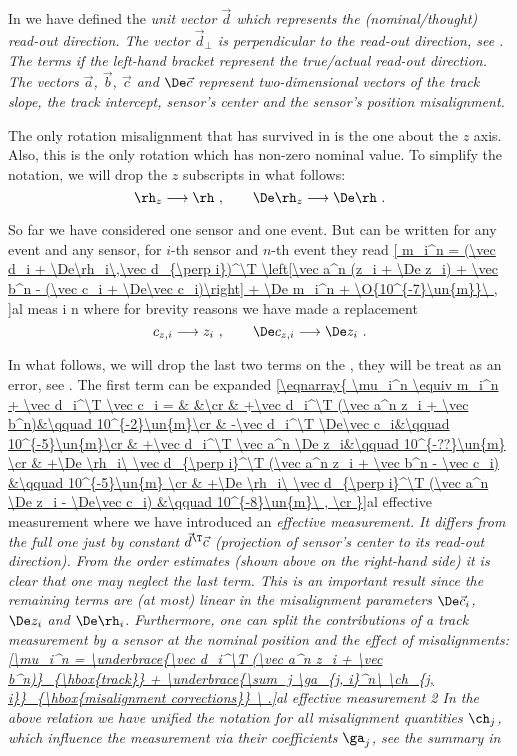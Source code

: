 In  we have defined the \em{unit} vector $\vec d$ which represents the (nominal/thought) \em{read-out direction}. The vector $\vec d_\perp$ is perpendicular to the read-out direction, see . The terms if the left-hand bracket represent the true/actual read-out direction. The vectors $\vec a$, $\vec b$, $\vec c$ and $\De \vec c$ represent two-dimensional vectors of the track slope, the track intercept, sensor's center and the sensor's position misalignment.

The only rotation misalignment that has survived in  is the one about the $z$ axis. Also, this is the only rotation which has non-zero nominal value. To simplify the notation, we will drop the $z$ subscripts in what follows:
$$\rh_z \longrightarrow \rh\ ,\qquad \De\rh_z \longrightarrow \De\rh\ .$$

So far we have considered one sensor and one event. But  can be written for any event and any sensor, for $i$-th sensor and $n$-th event they read
\eqref{
m_i^n = (\vec d_i + \De\rh_i\,\vec d_{\perp i})^\T \left[\vec a^n (z_i + \De z_i) + \vec b^n - (\vec c_i + \De\vec c_i)\right] + \De m_i^n + \O{10^{-7}\un{m}}\ ,
}{al meas i n}
where for brevity reasons we have made a replacement
$$c_{z,i} \longrightarrow z_i\ ,\qquad \De c_{z,i} \longrightarrow \De z_i\ .$$

In what follows, we will drop the last two terms on the \rhs, they will be treat as an error, see . The first term can be expanded
\eqref{\eqnarray{
\mu_i^n \equiv m_i^n + \vec d_i^\T \vec c_i = & &\cr
& +\vec d_i^\T (\vec a^n z_i + \vec b^n)&\qquad 10^{-2}\un{m}\cr
& -\vec d_i^\T \De\vec c_i&\qquad 10^{-5}\un{m}\cr
& +\vec d_i^\T \vec a^n \De z_i&\qquad 10^{-??}\un{m} \cr
& +\De \rh_i\ \vec d_{\perp i}^\T (\vec a^n z_i + \vec b^n - \vec c_i) &\qquad 10^{-5}\un{m} \cr
& +\De \rh_i\ \vec d_{\perp i}^\T (\vec a^n \De z_i - \De\vec c_i) &\qquad 10^{-8}\un{m}\ , \cr
}}{al effective measurement}
where we have introduced an \em{effective measurement}. It differs from the full one just by constant $\vec d^\T \vec c$ (projection of sensor's center to its read-out direction). From the order estimates (shown above on the right-hand side) it is clear that one may neglect the last term. This is an important result since the remaining terms are (at most) linear in the misalignment parameters $\De \vec c_i$, $\De z_i$ and $\De \rh_i$. Furthermore, one can split the contributions of a track measurement by a sensor at the nominal position and the effect of misalignments:
\eqref{\mu_i^n =
\underbrace{\vec d_i^\T (\vec a^n z_i + \vec b^n)}_{\hbox{track}}
+
\underbrace{\sum_j \ga_{j, i}^n\ \ch_{j, i}}_{\hbox{misalignment corrections}}
\ .}{al effective measurement 2}
In the above relation we have unified the notation for all misalignment quantities $\ch_j$, which influence the measurement via their coefficients $\ga_j$, see the summary in 

